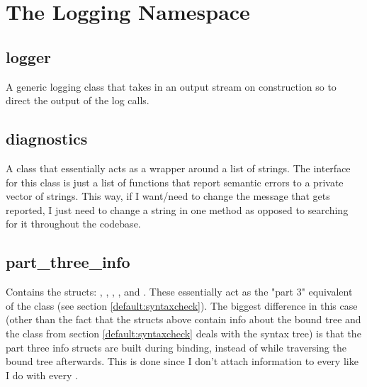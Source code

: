 \documentclass{article}
\begin{document}

\section{The Logging Namespace}
\label{logging:namespace}

\subsection{logger}
\label{logging:logger}
A generic logging class that takes in an output stream on construction so to direct the output of the log calls.

\subsection{diagnostics}
\label{logging:diagnostics}
A class that essentially acts as a wrapper around a list of strings.
The interface for this class is just a list of functions that report semantic errors to a private vector of strings.
This way, if I want/need to change the message that gets reported, I just need to change a string in one method as opposed to searching for it throughout the codebase.

\subsection{part\_three\_info}
\label{logging:seminfo}
Contains the structs: , , , , and .
These essentially act as the "part 3" equivalent of the  class (see section \ref{default:syntaxcheck}).
The biggest difference in this case (other than the fact that the structs above contain info about the bound tree and the class from section \ref{default:syntaxcheck} deals with the syntax tree) is that the part three info structs are built during binding, instead of while traversing the bound tree afterwards.
This is done since I don't attach  information to every  like I do with every .

\end{document}
